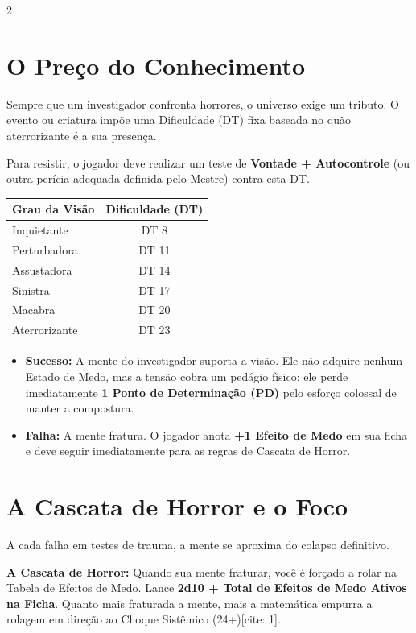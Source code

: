 \documentclass[a4paper,11pt,openany]{book}
\begin{document}
\begin{multicols}{2}
\section{O Preço do Conhecimento}

Sempre que um investigador confronta horrores, o universo exige um tributo. O evento ou criatura impõe uma Dificuldade (DT) fixa baseada no quão aterrorizante é a sua presença. 

Para resistir, o jogador deve realizar um teste de \textbf{Vontade + Autocontrole} (ou outra perícia adequada definida pelo Mestre) contra esta DT.

\setlength{\tabcolsep}{4pt}
\begin{table}[H]
\centering
\sffamily
{}
\begin{tabular}{lc}
\toprule
\textbf{Grau da Visão} & \textbf{Dificuldade (DT)} \\
\midrule
Inquietante & DT 8 \\
Perturbadora & DT 11 \\
Assustadora & DT 14 \\
Sinistra & DT 17 \\
Macabra & DT 20 \\
Aterrorizante & DT 23 \\
\bottomrule
\end{tabular}
\end{table}

\begin{itemize}
    \item \textbf{Sucesso:} A mente do investigador suporta a visão. Ele não adquire nenhum Estado de Medo, mas a tensão cobra um pedágio físico: ele perde imediatamente \textbf{1 Ponto de Determinação (PD)} pelo esforço colossal de manter a compostura.
    \item \textbf{Falha:} A mente fratura. O jogador anota \textbf{+1 Efeito de Medo} em sua ficha e deve seguir imediatamente para as regras de Cascata de Horror.
\end{itemize}

\section{A Cascata de Horror e o Foco}

A cada falha em testes de trauma, a mente se aproxima do colapso definitivo. 

\begin{regra}
\textbf{A Cascata de Horror:} Quando sua mente fraturar, você é forçado a rolar na Tabela de Efeitos de Medo. Lance \textbf{2d10 + Total de Efeitos de Medo Ativos na Ficha}. Quanto mais fraturada a mente, mais a matemática empurra a rolagem em direção ao Choque Sistêmico (24+)[cite: 1].
\end{regra}


\end{multicols}
\end{document}

